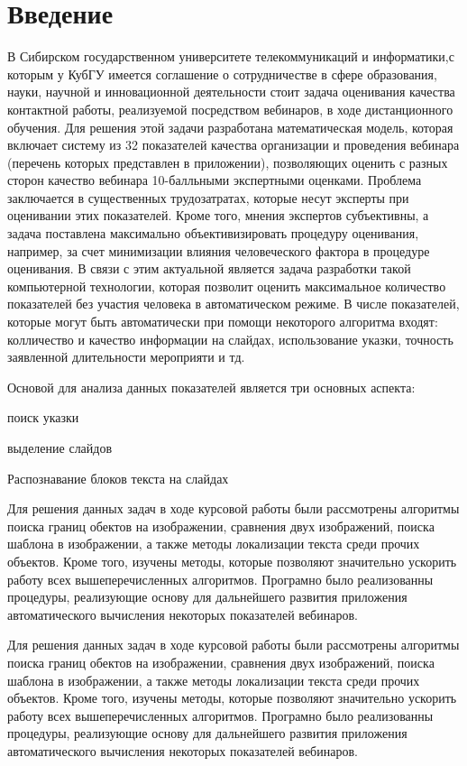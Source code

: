 \documentclass[oneside,final,14pt]{extreport}
\begin{document}
\tableofcontents
\newpage
\chapter*{Введение}

В Сибирском государственном университете телекоммуникаций и информатики,с которым у КубГУ имеется соглашение о сотрудничестве в сфере образования, науки, научной и инновационной деятельности стоит задача оценивания
качества контактной работы, реализуемой посредством вебинаров, в ходе дистанционного обучения. 
Для решения этой задачи разработана математическая модель, которая включает систему из 32 показателей качества организации и проведения вебинара (перечень которых представлен в приложении), позволяющих оценить с разных сторон  качество вебинара 10-балльными экспертными оценками. Проблема заключается в существенных трудозатратах, которые несут эксперты при оценивании этих показателей. Кроме того, мнения экспертов субъективны, а задача поставлена максимально объективизировать процедуру оценивания, например, за счет минимизации влияния человеческого фактора в процедуре оценивания. В связи с этим актуальной является  задача разработки такой компьютерной технологии, которая позволит оценить максимальное количество показателей без участия человека в автоматическом режиме. В числе показателей, которые могут быть автоматически при помощи некоторого алгоритма входят: колличество и качество информации на слайдах, использование указки, точность заявленной длительности мероприяти и тд.

Основой для анализа данных показателей является три основных аспекта:

поиск указки

выделение слайдов

Распознавание блоков текста на слайдах

	Для решения данных задач в ходе курсовой работы были рассмотрены алгоритмы поиска границ обектов на изображении, сравнения двух изображений, поиска шаблона в изображении, а также методы локализации текста среди прочих объектов. Кроме того, изучены методы, которые позволяют значительно ускорить работу всех вышеперечисленных алгоритмов. Програмно было реализованны процедуры, реализующие основу для дальнейшего развития приложения автоматического вычисления некоторых показателей вебинаров. 

	Для решения данных задач в ходе курсовой работы были рассмотрены алгоритмы поиска границ обектов на изображении, сравнения двух изображений, поиска шаблона в изображении, а также методы локализации текста среди прочих объектов. Кроме того, изучены методы, которые позволяют значительно ускорить работу всех вышеперечисленных алгоритмов. Програмно было реализованны процедуры, реализующие основу для дальнейшего развития приложения автоматического вычисления некоторых показателей вебинаров. 
\end{document}

